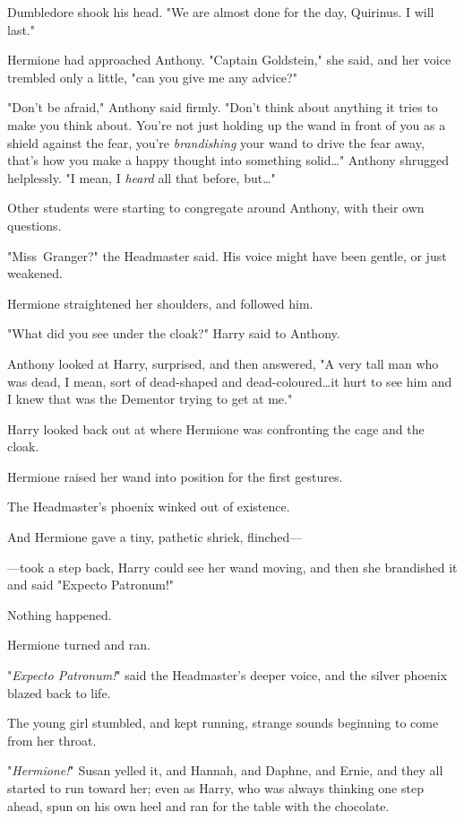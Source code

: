 Dumbledore shook his head. "We are almost done for the day, Quirinus. I will
last."

Hermione had approached Anthony. "Captain Goldstein," she said, and her voice
trembled only a little, "can you give me any advice?"

"Don't be afraid," Anthony said firmly. "Don't think about anything it tries to
make you think about. You're not just holding up the wand in front of you as a
shield against the fear, you're \emph{brandishing} your wand to drive the fear
away, that's how you make a happy thought into something solid…" Anthony
shrugged helplessly. "I mean, I \emph{heard} all that before, but…"

Other students were starting to congregate around Anthony, with their own
questions.

"Miss~Granger?" the Headmaster said. His voice might have been gentle, or just
weakened.

Hermione straightened her shoulders, and followed him.

"What did you see under the cloak?" Harry said to Anthony.

Anthony looked at Harry, surprised, and then answered, "A very tall man who was
dead, I mean, sort of dead-shaped and dead-coloured…it hurt to see him
and I knew that was the Dementor trying to get at me."

Harry looked back out at where Hermione was confronting the cage and the cloak.

Hermione raised her wand into position for the first gestures.

The Headmaster's phoenix winked out of existence.

And Hermione gave a tiny, pathetic shriek, flinched—

—took a step back, Harry could see her wand moving, and then she brandished
it and said "Expecto Patronum!"

Nothing happened.

Hermione turned and ran.

"\emph{Expecto Patronum!}" said the Headmaster's deeper voice, and the silver
phoenix blazed back to life.

The young girl stumbled, and kept running, strange sounds beginning to come
from her throat.

"\emph{Hermione!}" Susan yelled it, and Hannah, and Daphne, and Ernie, and they
all started to run toward her; even as Harry, who was always thinking one step
ahead, spun on his own heel and ran for the table with the chocolate.


